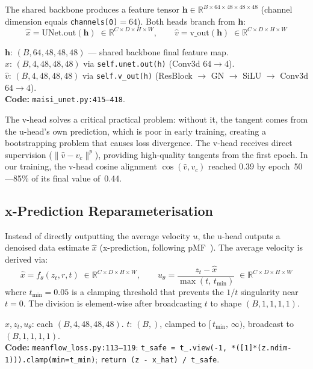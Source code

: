 \documentclass[11pt,a4paper]{article}
\newcommand{\code}[1]{\texttt{#1}}
\begin{document}
The shared backbone produces a feature tensor $\mathbf{h} \in
\mathbb{R}^{B \times 64 \times 48 \times 48 \times 48}$ (channel dimension
equals \code{channels[0]}$= 64$).  Both heads branch from $\mathbf{h}$:
\begin{equation}
  \hat{x} = \mathrm{UNet.out}(\mathbf{h})
    \;\in \mathbb{R}^{C \times D \times H \times W},
  \qquad
  \hat{v} = \mathrm{v\_out}(\mathbf{h})
    \;\in \mathbb{R}^{C \times D \times H \times W}
  \label{eq:dual_heads}
\end{equation}
\begin{shapes}
$\mathbf{h}$: $(B, 64, 48, 48, 48)$ --- shared backbone final feature map.\\
$\hat{x}$: $(B, 4, 48, 48, 48)$ via \code{self.unet.out(h)} (Conv3d $64 \to 4$).\\
$\hat{v}$: $(B, 4, 48, 48, 48)$ via \code{self.v\_out(h)} (ResBlock $\to$ GN $\to$ SiLU $\to$ Conv3d $64 \to 4$).\\
\textbf{Code:} \code{maisi\_unet.py:415--418}.
\end{shapes}

\noindent
The v-head solves a critical practical problem: without it, the tangent comes
from the u-head's own prediction, which is poor in early training, creating a
bootstrapping problem that causes loss divergence.  The v-head receives direct
supervision ($\|\hat{v} - v_c\|^p$), providing high-quality tangents from the
first epoch.  In our training, the v-head cosine alignment $\cos(\hat{v},v_c)$
reached 0.39 by epoch~50---85\% of its final value of~0.44.

\subsection{x-Prediction Reparameterisation}
\label{sec:xpred}

Instead of directly outputting the average velocity $u$, the u-head outputs a
denoised data estimate $\hat{x}$ (x-prediction, following pMF~\cite{pmf}).
The average velocity is derived via:
\begin{equation}
  \hat{x} = f_\theta(z_t,r,t)
    \;\in \mathbb{R}^{C \times D \times H \times W},
  \qquad
  u_\theta = \frac{z_t - \hat{x}}{\max(t,\,t_{\min})}
    \;\in \mathbb{R}^{C \times D \times H \times W}
  \label{eq:xpred}
\end{equation}
where $t_{\min} = 0.05$ is a clamping threshold that prevents the $1/t$
singularity near $t = 0$.  The division is element-wise after broadcasting
$t$ to shape $(B, 1, 1, 1, 1)$.
\begin{shapes}
$\hat{x}, z_t, u_\theta$: each $(B, 4, 48, 48, 48)$.
\quad $t$: $(B,)$, clamped to $[\,t_{\min},\,\infty)$, broadcast to $(B,1,1,1,1)$.\\
\textbf{Code:} \code{meanflow\_loss.py:113--119}:
\code{t\_safe = t\_.view(-1, *([1]*(z.ndim-1))).clamp(min=t\_min)};
\code{return (z - x\_hat) / t\_safe}.
\end{shapes}
\end{document}
